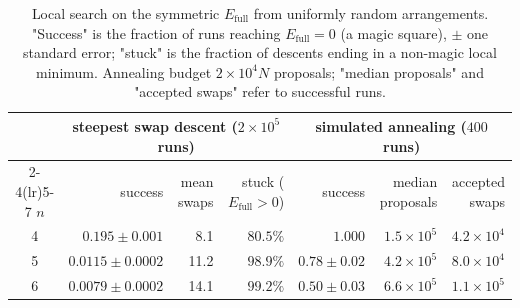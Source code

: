 \begin{table}[t]
\centering
\small
\begin{tabular}{c rrr rrr}
\toprule
 & \multicolumn{3}{c}{steepest swap descent ($2\times10^5$ runs)} & \multicolumn{3}{c}{simulated annealing ($400$ runs)}\\
\cmidrule(lr){2-4}\cmidrule(lr){5-7}
$n$ & success & mean swaps & stuck ($E_{\mathrm{full}}>0$) & success & median proposals & accepted swaps \\
\midrule
4 & $0.195\pm0.001$ & 8.1  & $80.5\%$ & $1.000$ & $1.5\times10^5$ & $4.2\times10^4$ \\
5 & $0.0115\pm0.0002$ & 11.2 & $98.9\%$ & $0.78\pm0.02$ & $4.2\times10^5$ & $8.0\times10^4$ \\
6 & $0.0079\pm0.0002$ & 14.1 & $99.2\%$ & $0.50\pm0.03$ & $6.6\times10^5$ & $1.1\times10^5$ \\
\bottomrule
\end{tabular}
\caption{Local search on the symmetric $E_{\mathrm{full}}$ from uniformly random arrangements.
"Success" is the fraction of runs reaching $E_{\mathrm{full}}=0$ (a magic square), $\pm$ one
standard error; "stuck" is the fraction of descents ending in a non-magic local minimum. Annealing
budget $2\times10^4N$ proposals; "median proposals" and "accepted swaps" refer to successful runs.}
\label{tab:search}
\end{table}
